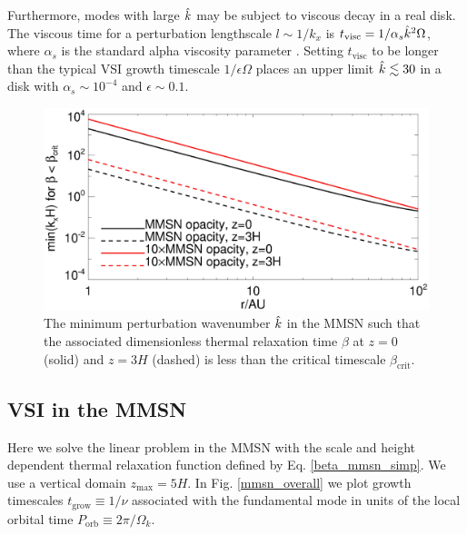 Furthermore, modes with large $\hat{k}$ may be subject to viscous decay
in a real disk. The viscous time for a perturbation lengthscale
$l\sim 1/k_x$ is $t_\mathrm{visc} = 1/\alpha_s\hat{k}^2\Omega $, where
$\alpha_s$ is the standard alpha viscosity parameter
\citep{shakura73}. Setting $t_\mathrm{visc}$ to be longer than the
typical VSI growth timescale $1/\epsilon\Omega$ places an upper limit
$\hat{k} \lesssim 30$ in a disk with $\alpha_s\sim 10^{-4}$ and
$\epsilon \sim 0.1$.    



\begin{figure}
  \includegraphics[width=\linewidth]{figures/bcrit_mink} 
  \caption{The minimum perturbation wavenumber $\hat{k}$ in
    the MMSN such that the associated dimensionless thermal
    relaxation time  $\beta$ at $z=0$ (solid) and $z=3H$ (dashed) is
    less than the critical timescale $\beta_\mathrm{crit}$.   
    \label{mmsn_bcrit_bcool_mink}}   
\end{figure}  


\subsection{VSI in the MMSN}
Here we solve the linear problem in the MMSN with the scale and
height dependent thermal relaxation function defined by
Eq. \ref{beta_mmsn_simp}.  We use a vertical
domain $z_\mathrm{max}=5H$. In Fig. \ref{mmsn_overall} we plot growth
timescales $t_\mathrm{grow} \equiv 1/\nu$ associated with the
fundamental mode in units of the local orbital time
$P_\mathrm{orb}\equiv 2\pi/\Omega_k$.    

